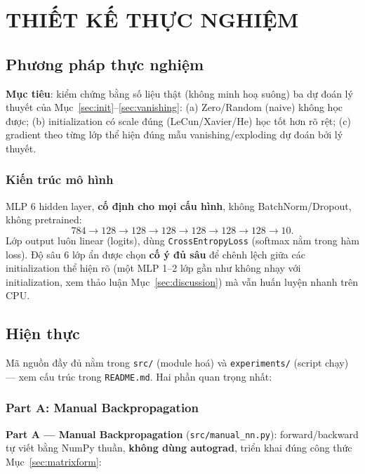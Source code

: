 \documentclass[12pt,a4paper]{report}
\begin{document}
\chapter{THIẾT KẾ THỰC NGHIỆM}
\section{Phương pháp thực nghiệm}
\label{sec:methodology}

\textbf{Mục tiêu}: kiểm chứng bằng số liệu thật (không minh hoạ suông) ba
dự đoán lý thuyết của Mục~\ref{sec:init}--\ref{sec:vanishing}: (a) Zero/Random
(naive) không học được; (b) initialization có scale đúng (LeCun/Xavier/He)
học tốt hơn rõ rệt; (c) gradient theo từng lớp thể hiện đúng mẫu
vanishing/exploding dự đoán bởi lý thuyết.

\subsection{Kiến trúc mô hình}
\label{sec:architecture}

MLP 6 hidden layer, \textbf{cố định cho mọi cấu hình}, không
BatchNorm/Dropout, không pretrained:
$$784 \to 128 \to 128 \to 128 \to 128 \to 128 \to 128 \to 10.$$
Lớp output luôn linear (logits), dùng \texttt{CrossEntropyLoss} (softmax
nằm trong hàm loss). Độ sâu 6 lớp ẩn được chọn \textbf{cố ý đủ sâu} để
chênh lệch giữa các initialization thể hiện rõ (một MLP 1--2 lớp gần như
không nhạy với initialization, xem thảo luận Mục~\ref{sec:discussion}) mà
vẫn huấn luyện nhanh trên CPU.

\section{Hiện thực}
\label{sec:implementation}

Mã nguồn đầy đủ nằm trong \texttt{src/} (module hoá) và
\texttt{experiments/} (script chạy) --- xem cấu trúc trong
\texttt{README.md}. Hai phần quan trọng nhất:

\subsection{Part A: Manual Backpropagation}

\textbf{Part A --- Manual Backpropagation} (\texttt{src/manual\_nn.py}):
forward/backward tự viết bằng NumPy thuần, \textbf{không dùng autograd},
triển khai đúng công thức Mục~\ref{sec:matrixform}:
\end{document}
